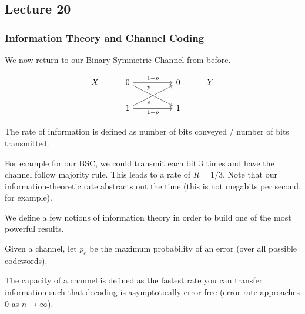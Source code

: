 \subsection{Lecture 20}
\subsubsection{Information Theory and Channel Coding}
We now return to our Binary Symmetric Channel from before.

\[\begin{tikzcd}
	X & 0 && 0 & Y \\
	& 1 && 1
	\arrow["{1-p}", from=1-2, to=1-4]
	\arrow["p"'{pos=0.3}, from=2-2, to=1-4]
	\arrow["p"{pos=0.3}, from=1-2, to=2-4]
	\arrow["{1-p}"', from=2-2, to=2-4]
\end{tikzcd}\]

\begin{definition}
    The rate of information is defined as number of bits conveyed / number of bits transmitted.
\end{definition}

For example for our BSC, we could transmit each bit 3 times and have the channel follow majority rule. This leads to a rate of 
$R = 1/3$.
Note that our information-theoretic rate abstracts out the time (this is not megabits per second, for example).

We define a few notions of information theory in order to build one of the most powerful results.

\begin{definition}
    Given a channel, let $p_e$ be the maximum probability of an error (over all possible codewords).
\end{definition}

\begin{definition}[Capacity]
    The capacity of a channel is defined as the fastest rate you can transfer information such that decoding is asymptotically error-free (error rate approaches 0 as $n \to \infty$).
\end{definition}


